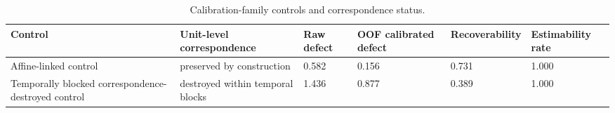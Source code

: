 \begin{table}[t]
\caption{Calibration-family controls and correspondence status.}
\label{tab:exp4_calibration_controls}
\begin{tabular}{llllll}
\toprule
Control & Unit-level correspondence & Raw defect & OOF calibrated defect & Recoverability & Estimability rate \\
\midrule
Affine-linked control & preserved by construction & 0.582 & 0.156 & 0.731 & 1.000 \\
Temporally blocked correspondence-destroyed control & destroyed within temporal blocks & 1.436 & 0.877 & 0.389 & 1.000 \\
\bottomrule
\end{tabular}
\end{table}
